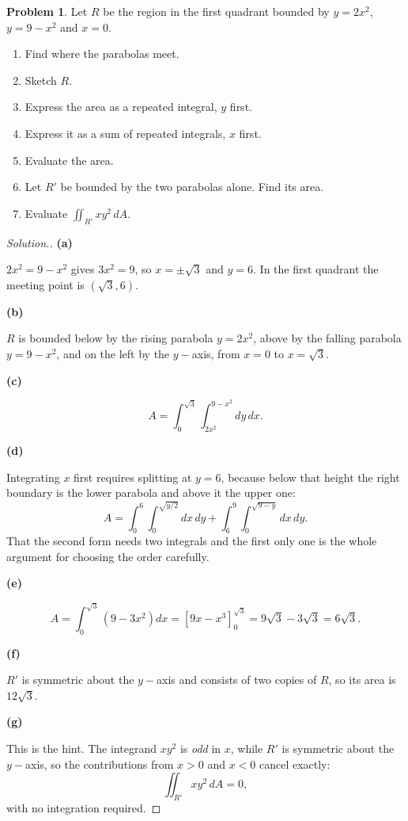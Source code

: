 \documentclass[11pt,a4paper]{article}
\theoremstyle{definition}
\newtheorem{problemx}{Problem}[subsection]
\newenvironment{problem}{\begin{problemx}}{\end{problemx}}
\newenvironment{solution}
  {\renewcommand{\qedsymbol}{}\begin{proof}[\textit{Solution}.]}
  {\end{proof}}
\newcommand{\subhead}[1]{%
  \par\medskip\noindent\textbf{#1}\par\nobreak\smallskip}
\begin{document}
\begin{problem}
Let $R$ be the region in the first quadrant bounded by $y = 2x^2$,
$y = 9-x^2$ and $x=0$.
\begin{enumerate}
\item[(a)] Find where the parabolas meet.
\item[(b)] Sketch $R$.
\item[(c)] Express the area as a repeated integral, $y$ first.
\item[(d)] Express it as a sum of repeated integrals, $x$ first.
\item[(e)] Evaluate the area.
\item[(f)] Let $R'$ be bounded by the two parabolas alone. Find its area.
\item[(g)] Evaluate $\displaystyle{\iint_{R'}xy^2\,dA}$.
\end{enumerate}
\end{problem}
\begin{solution}
\subhead{(a)}
$2x^2 = 9-x^2$ gives $3x^2 = 9$, so $x = \pm\sqrt3$ and $y = 6$. In the first
quadrant the meeting point is $(\sqrt3, 6)$.

\subhead{(b)}
$R$ is bounded below by the rising parabola $y=2x^2$, above by the falling
parabola $y = 9-x^2$, and on the left by the $y-$axis, from $x=0$ to
$x=\sqrt3$.

\subhead{(c)}
\[A = \int_0^{\sqrt3}\int_{2x^2}^{9-x^2}dy\,dx .\]

\subhead{(d)}
Integrating $x$ first requires splitting at $y=6$, because below that height the
right boundary is the lower parabola and above it the upper one:
\[A = \int_0^6\int_0^{\sqrt{y/2}}dx\,dy
+ \int_6^9\int_0^{\sqrt{9-y}}dx\,dy .\]
That the second form needs two integrals and the first only one is the whole
argument for choosing the order carefully.

\subhead{(e)}
\[A = \int_0^{\sqrt3}(9-3x^2)dx
= [9x - x^3]_0^{\sqrt3} = 9\sqrt3 - 3\sqrt3 = 6\sqrt3 .\]

\subhead{(f)}
$R'$ is symmetric about the $y-$axis and consists of two copies of $R$, so its
area is $12\sqrt3$.

\subhead{(g)}
This is the hint. The integrand $xy^2$ is \emph{odd} in $x$, while $R'$ is
symmetric about the $y-$axis, so the contributions from $x>0$ and $x<0$ cancel
exactly:
\[\iint_{R'}xy^2\,dA = 0 ,\]
with no integration required.
\end{solution}
\end{document}
